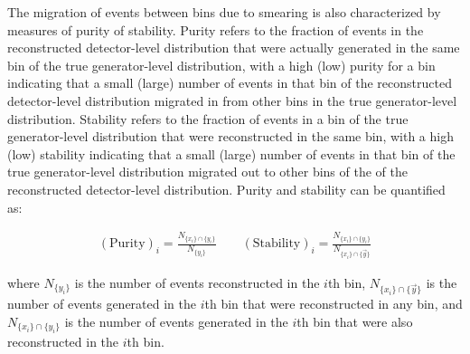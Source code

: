 The migration of events between bins due to smearing is also characterized by measures of purity of stability.
Purity refers to the fraction of events in the reconstructed detector-level distribution that were actually generated in the same bin of the true generator-level distribution, with a high (low) purity for a bin indicating that a small (large) number of events in that bin of the reconstructed detector-level distribution migrated in from other bins in the true generator-level distribution.
Stability refers to the fraction of events in a bin of the true generator-level distribution that were reconstructed in the same bin, with a high (low) stability indicating that a small (large) number of events in that bin of the true generator-level distribution migrated out to other bins of the of the reconstructed detector-level distribution.
Purity and stability can be quantified as:
\begin{linenomath*}
\begin{align}
(\text{Purity})_i = \frac{N_{ \{ x_i \} \cap \{ y_i \} }}{N_{ \{ y_i \} }} \quad \quad
(\text{Stability})_i = \frac{N_{ \{ x_i \} \cap \{ y_i \} }}{N_{ \{ x_i \} \cap \{ \vec{y} \}}}
\end{align}
\end{linenomath*}
where $N_{ \{ y_i \} }$ is the number of events reconstructed in the $i$th bin, $N_{ \{ x_i \} \cap \{ \vec{y} \}}$ is the number of events generated in the $i$th bin that were reconstructed in any bin, and $N_{ \{ x_i \} \cap \{ y_i \} }$ is the number of events generated in the $i$th bin that were also reconstructed in the $i$th bin.

